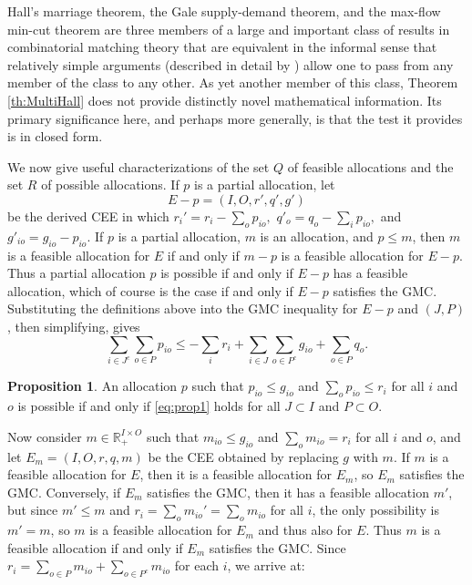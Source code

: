 \documentclass[12pt, A4paper]{article}
\theoremstyle{definition}
\newtheorem{prop}{Proposition}
\renewcommand{\Re}{\mathbb{R}}
\begin{document}
Hall's marriage theorem, the Gale supply-demand theorem, and the max-flow min-cut theorem are three members of a large and important class of results in combinatorial matching theory that are equivalent in the informal sense that relatively simple arguments (described in detail by \cite{Rei78,Rei85}) allow one to pass from any member of the class to any other.  As yet another member of this class, Theorem \ref{th:MultiHall} does not provide distinctly novel mathematical information.  Its primary significance here, and perhaps more generally, is that the test it provides is in closed form.

 We now give useful characterizations of the set $Q$ of feasible allocations and the set $R$ of possible allocations.
If $p$ is a partial allocation, let $$E - p = (I,O,r',q',g')$$ be the derived CEE in which $r_i' = r_i - \sum_o p_{io},$ $q'_o = q_o - \sum_i p_{io},$ and $g'_{io} = g_{io} - p_{io}.$  If $p$ is a partial allocation, $m$ is an allocation, and $p \le m$, then $m$ is a feasible allocation for $E$ if and only if $m - p$ is a feasible allocation for $E - p$.  Thus a partial allocation $p$ is possible if and only if $E - p$ has a feasible allocation, which of course is the case if and only if $E - p$ satisfies the GMC.  Substituting the definitions above into the GMC inequality for $E - p$ and $(J,P)$, then simplifying, gives
\begin{equation} \label{eq:prop1}
\sum_{i \in J^c}\sum_{o \in P} p_{io} \le -\sum_i r_i + \sum_{i \in J}\sum_{o \in P^c} g_{io} + \sum_{o \in P} q_o.
\end{equation}

\begin{prop}
  An allocation $p$ such that $p_{io} \le g_{io}$ and $\sum_o p_{io} \le r_i$ for all $i$ and $o$ is possible if and only if \eqref{eq:prop1} holds for all $J \subset I$ and $P \subset O$.
\end{prop}

Now consider $m \in \Re^{I \times O}_+$ such that $m_{io} \le g_{io}$ and $\sum_o m_{io} = r_i$ for all $i$ and $o$, and let $E_m = (I,O,r,q,m)$ be the CEE obtained by replacing $g$ with $m$.  If $m$ is a feasible allocation for $E$, then it is a feasible allocation for $E_m$, so $E_m$ satisfies the GMC.  Conversely, if $E_m$ satisfies the GMC, then it has a feasible allocation $m'$, but since $m' \le m$ and $r_i = \sum_o m_{io}' = \sum_o m_{io}$ for all $i$, the only possibility is $m' = m$, so $m$ is a feasible allocation for $E_m$ and thus also for $E$.  Thus $m$ is a feasible allocation if and only if $E_m$ satisfies the GMC.  Since $r_i = \sum_{o \in P} m_{io} + \sum_{o \in P^c} m_{io}$ for each $i$, we arrive at:
\end{document}
